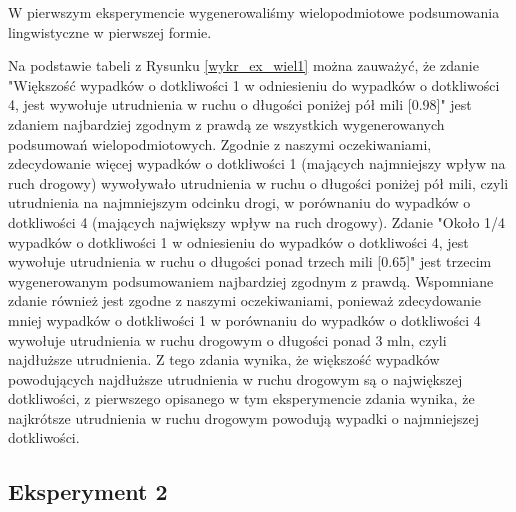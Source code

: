 \documentclass{classrep}
\begin{document}
W pierwszym eksperymencie wygenerowaliśmy wielopodmiotowe podsumowania lingwistyczne w pierwszej formie.

Na podstawie tabeli z Rysunku \ref{wykr_ex_wiel1} można zauważyć, że zdanie "Większość wypadków o dotkliwości 1 w odniesieniu do wypadków o dotkliwości 4, jest wywołuje utrudnienia w ruchu o długości poniżej pół mili [0.98]" jest zdaniem najbardziej zgodnym z prawdą ze wszystkich wygenerowanych podsumowań wielopodmiotowych. Zgodnie z naszymi oczekiwaniami, zdecydowanie więcej wypadków o dotkliwości 1 (mających najmniejszy wpływ na ruch drogowy) wywoływało utrudnienia w ruchu o długości poniżej pół mili, czyli utrudnienia na najmniejszym odcinku drogi, w porównaniu do wypadków o dotkliwości 4 (mających największy wpływ na ruch drogowy). Zdanie "Około 1/4 wypadków o dotkliwości 1 w odniesieniu do wypadków o dotkliwości 4, jest wywołuje utrudnienia w ruchu o długości ponad trzech mili [0.65]" jest trzecim wygenerowanym podsumowaniem najbardziej zgodnym z prawdą. Wspomniane zdanie również jest zgodne z naszymi oczekiwaniami, ponieważ zdecydowanie mniej wypadków o dotkliwości 1 w porównaniu do wypadków o dotkliwości 4 wywołuje utrudnienia w ruchu drogowym o długości ponad 3 mln, czyli najdłuższe utrudnienia. Z tego zdania wynika, że większość wypadków powodujących najdłuższe utrudnienia w ruchu drogowym są o największej dotkliwości, z pierwszego opisanego w tym eksperymencie zdania wynika, że najkrótsze utrudnienia w ruchu drogowym powodują wypadki o najmniejszej dotkliwości.

\newpage
\subsection{Eksperyment 2}
\label{section:ex_wiel2}
\end{document}
